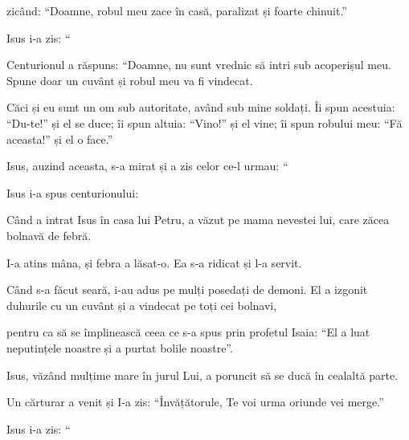 {zicând: “Doamne, robul meu zace în casă, paralizat și foarte chinuit.”


\par }{\PP {}Isus i-a zis: “{}


\par }{\PP {}Centurionul a răspuns: “Doamne, nu sunt vrednic să intri sub acoperișul meu. Spune doar un cuvânt și robul meu va fi vindecat.

Căci și eu sunt un om sub autoritate, având sub mine soldați. Îi spun acestuia: “Du-te!” și el se duce; îi spun altuia: “Vino!” și el vine; îi spun robului meu: “Fă aceasta!” și el o face.”


\par }{\PP {}Isus, auzind aceasta, s-a mirat și a zis celor ce-l urmau: “{}



Isus i-a spus centurionului:
{}


\par }{\PP {}Când a intrat Isus în casa lui Petru, a văzut pe mama nevestei lui, care zăcea bolnavă de febră.

I-a atins mâna, și febra a lăsat-o. Ea s-a ridicat și l-a servit.

Când s-a făcut seară, i-au adus pe mulți posedați de demoni. El a izgonit duhurile cu un cuvânt și a vindecat pe toți cei bolnavi,

pentru ca să se împlinească ceea ce s-a spus prin profetul Isaia: “El a luat neputințele noastre și a purtat bolile noastre”.


\par }{\PP {}Isus, văzând mulțime mare în jurul Lui, a poruncit să se ducă în cealaltă parte.


\par }{\PP {}Un cărturar a venit și I-a zis: “Învățătorule, Te voi urma oriunde vei merge.”


\par }{\PP {}Isus i-a zis: “{}


}
